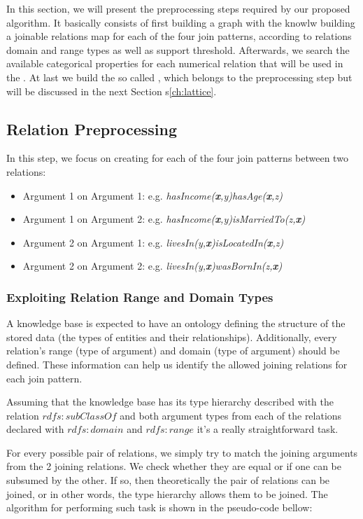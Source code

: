 In this section, we will present the preprocessing steps required by our proposed algorithm. It basically consists of
first building a graph with the knowlw building a joinable relations map for each of the four join patterns, according
to relations domain and range types as well as support threshold. Afterwards, we search the available categorical
properties for each numerical relation that will be used in the \graphname. At last we build the so called \graphname,
which belongs to the preprocessing step but will be discussed in the next Section s\ref{ch:lattice}.

\subsection{Relation Preprocessing}

In this step, we focus on creating for each of the four join patterns between two relations:

\begin{itemize}
 \item Argument 1 on Argument 1: e.g. \emph{hasIncome(\textbf{x},y)hasAge(\textbf{x},z)}
 \item Argument 1 on Argument 2: e.g. \emph{hasIncome(\textbf{x},y)isMarriedTo(z,\textbf{x})}
 \item Argument 2 on Argument 1: e.g. \emph{livesIn(y,\textbf{x})isLocatedIn(\textbf{x},z)}
 \item Argument 2 on Argument 2: e.g. \emph{livesIn(y,\textbf{x})wasBornIn(z,\textbf{x})}
\end{itemize}

\subsubsection{Exploiting Relation Range and Domain Types}

A knowledge base is expected to have an ontology defining the structure of the stored data (the types of entities and
their relationships). Additionally, every relation's range (type of  argument) and domain (type of 
argument) should be defined. These information can help us identify the allowed joining relations for each join pattern.

Assuming that the knowledge base has its type hierarchy described with the relation $rdfs:subClassOf$ and both argument
types from each of the relations declared with $rdfs:domain$ and $rdfs:range$ it's a really straightforward task.

For every possible pair of relations, we simply try to match the joining arguments from the 2 joining relations. We
check whether they are equal or if one can be subsumed by the other. If so, then theoretically the pair of relations
can be joined, or in other words, the type hierarchy allows them to be joined. The algorithm for performing such task is
shown in the pseudo-code bellow:

